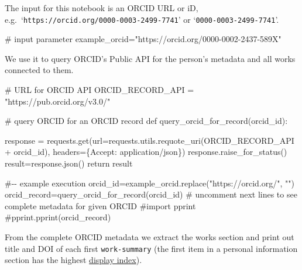 \documentclass[
  letterpaper,
  DIV=11,
  numbers=noendperiod]{scrreprt}
\newenvironment{Shaded}{\begin{snugshade}}{\end{snugshade}}
\newcommand{\CommentTok}[1]{\textcolor[rgb]{0.37,0.37,0.37}{#1}}
\newcommand{\ControlFlowTok}[1]{\textcolor[rgb]{0.00,0.23,0.31}{#1}}
\newcommand{\KeywordTok}[1]{\textcolor[rgb]{0.00,0.23,0.31}{#1}}
\newcommand{\NormalTok}[1]{\textcolor[rgb]{0.00,0.23,0.31}{#1}}
\newcommand{\OperatorTok}[1]{\textcolor[rgb]{0.37,0.37,0.37}{#1}}
\newcommand{\StringTok}[1]{\textcolor[rgb]{0.13,0.47,0.30}{#1}}
\begin{document}
The input for this notebook is an ORCID URL or iD,
e.g.~`\texttt{https://orcid.org/0000-0003-2499-7741}' or
`\texttt{0000-0003-2499-7741}'.

\begin{Shaded}
\begin{Highlighting}[]
\CommentTok{\# input parameter}
\NormalTok{example\_orcid}\OperatorTok{=}\StringTok{"https://orcid.org/0000{-}0002{-}2437{-}589X"}
\end{Highlighting}
\end{Shaded}

We use it to query ORCID's Public API for the person's metadata and all
works connected to them.

\begin{Shaded}
\begin{Highlighting}[]
\CommentTok{\# URL for ORCID API}
\NormalTok{ORCID\_RECORD\_API }\OperatorTok{=} \StringTok{"https://pub.orcid.org/v3.0/"}

\CommentTok{\# query ORCID for an ORCID record}
\KeywordTok{def}\NormalTok{ query\_orcid\_for\_record(orcid\_id):}

\NormalTok{    response }\OperatorTok{=}\NormalTok{ requests.get(url}\OperatorTok{=}\NormalTok{requests.utils.requote\_uri(ORCID\_RECORD\_API }\OperatorTok{+}\NormalTok{ orcid\_id),}
\NormalTok{                          headers}\OperatorTok{=}\NormalTok{\{}\StringTok{\textquotesingle{}Accept\textquotesingle{}}\NormalTok{: }\StringTok{\textquotesingle{}application/json\textquotesingle{}}\NormalTok{\})}
\NormalTok{    response.raise\_for\_status()}
\NormalTok{    result}\OperatorTok{=}\NormalTok{response.json()}
    \ControlFlowTok{return}\NormalTok{ result}


\CommentTok{\#{-}{-} example execution}
\NormalTok{orcid\_id}\OperatorTok{=}\NormalTok{example\_orcid.replace(}\StringTok{"https://orcid.org/"}\NormalTok{, }\StringTok{""}\NormalTok{)}
\NormalTok{orcid\_record}\OperatorTok{=}\NormalTok{query\_orcid\_for\_record(orcid\_id)}
\CommentTok{\# uncomment next lines to see complete metadata for given ORCID}
\CommentTok{\#import pprint}
\CommentTok{\#pprint.pprint(orcid\_record)}
\end{Highlighting}
\end{Shaded}

From the complete ORCID metadata we extract the works section and print
out title and DOI of each first \texttt{work-summary} (the first item in
a personal information section has the highest
\href{https://info.orcid.org/documentation/integration-guide/orcid-record/\#Display_index}{display
index}).
\end{document}
